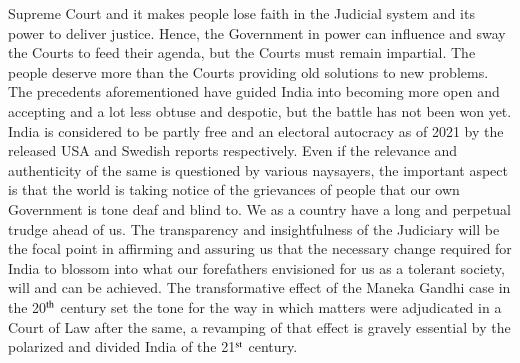 \begin{multicols}{2}
Supreme Court and it makes people lose faith in the Judicial system and its power to deliver
justice. Hence, the Government in power can influence and sway the Courts to feed their
agenda, but the Courts must remain impartial. The people deserve more than the Courts
providing old solutions to new problems. The precedents aforementioned have guided India
into becoming more open and accepting and a lot less obtuse and despotic, but the battle has
not been won yet. India is considered to be partly free and an electoral autocracy as of 2021
by the released USA and Swedish reports respectively. Even if the relevance and authenticity
of the same is questioned by various naysayers, the important aspect is that the world is
taking notice of the grievances of people that our own Government is tone deaf and blind to.
We as a country have a long and perpetual trudge ahead of us. The transparency and
insightfulness of the Judiciary will be the focal point in affirming and assuring us that the
necessary change required for India to blossom into what our forefathers envisioned for us as
a tolerant society, will and can be achieved. The transformative effect of the Maneka Gandhi
case in the 20$^{\rm th}$ century set the tone for the way in which matters were adjudicated in a Court
of Law after the same, a revamping of that effect is gravely essential by the polarized and
divided India of the 21$^{\rm st}$ century.

\end{multicols}
